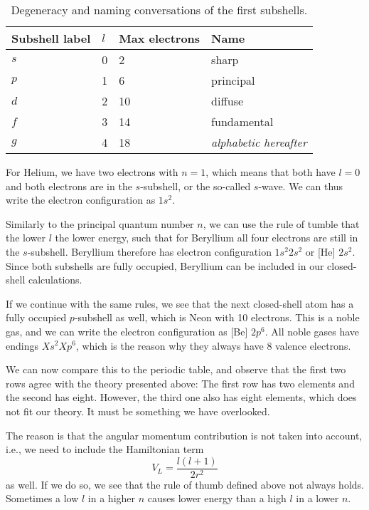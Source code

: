 \begin{table} [H]
	\caption{Degeneracy and naming conversations of the first subshells.  \vspace{2mm}}
	\begin{tabularx}{\textwidth}{X|X:X:X} \hline\hline
		\label{tab:subshells}
		Subshell label & $l$ & Max electrons & Name \\ \hline
		$s$ & 0 & 2 & sharp\\ 
		$p$ & 1 & 6 & principal\\
		$d$ & 2 & 10 & diffuse \\
		$f$ & 3 & 14 & fundamental \\
		$g$ & 4 & 18 & \textit{alphabetic hereafter} \\ \hline\hline
	\end{tabularx}
\end{table}

For Helium, we have two electrons with $n=1$, which means that both have $l=0$ and both electrons are in the $s$-subshell, or the so-called $s$-wave. We can thus write the electron configuration as $1s^2$. 

Similarly to the principal quantum number $n$, we can use the rule of tumble that the lower $l$ the lower energy, such that for Beryllium all four electrons are still in the $s$-subshell. Beryllium therefore has electron configuration $1s^2 2s^2$ or [He] $2s^2$. Since both subshells are fully occupied, Beryllium can be included in our closed-shell calculations. 

If we continue with the same rules, we see that the next closed-shell atom has a fully occupied $p$-subshell as well, which is Neon with 10 electrons. This is a noble gas, and we can write the electron configuration as [Be] $2p^6$. All noble gases have endings $Xs^2 Xp^6$, which is the reason why they always have 8 valence electrons.

We can now compare this to the periodic table, and observe that the first two rows agree with the theory presented above: The first row has two elements and the second has eight. However, the third one also has eight elements, which does not fit our theory. It must be something we have overlooked. 

The reason is that the angular momentum contribution is not taken into account, i.e., we need to include the Hamiltonian term
\begin{equation}
V_L=\frac{l(l+1)}{2r^2}
\end{equation}
as well. If we do so, we see that the rule of thumb defined above not always holds. Sometimes a low $l$ in a higher $n$ causes lower energy than a high $l$ in a lower $n$.

